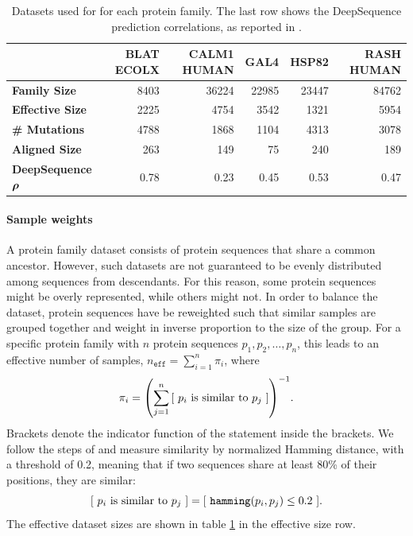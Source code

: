 \begin{table}[ht]
    \centering
    \begin{tabularx}{\textwidth}{lrrrrr}
    \hline
    & \textbf{BLAT ECOLX} & \textbf{CALM1 HUMAN} & \textbf{GAL4} & \textbf{HSP82} & \textbf{RASH HUMAN} \\ \hline
    \textbf{Family Size}              & 8403 & 36224 & 22985 & 23447 & 84762 \\
    \textbf{Effective Size}           & 2225 &  4754 &  3542 &  1321 &  5954 \\
    \textbf{\# Mutations}             & 4788 &  1868 &  1104 &  4313 &  3078 \\
    \textbf{Aligned Size}             &  263 &   149 &    75 &   240 &   189 \\
    \textbf{DeepSequence} $\bm{ \rho }$ & 0.78 &  0.23 &  0.45 &  0.53 &  0.47 \\
    \hline
    \end{tabularx}
    \caption{Datasets used for for each protein family. The last row shows the DeepSequence prediction correlations, as reported in \textcite{riesselman2018deep}.}
    \label{tab:datasets}
\end{table}

\paragraph{Sample weights} A protein family dataset consists of protein sequences that share a common ancestor. However, such datasets are not guaranteed to be evenly distributed among sequences from descendants. For this reason, some protein sequences might be overly represented, while others might not. In order to balance the dataset, protein sequences have be reweighted such that similar samples are grouped together and weight in inverse proportion to the size of the group. For a specific protein family with $n$ protein sequences $p_1, p_2, \ldots, p_n$, this leads to an effective number of samples, $n_{\texttt{eff}} = \sum_{i = 1}^n \pi_i$, where
    \[ \pi_i ={\mathopen{} \left( \sum_{j = 1}^n {\mathopen{} \left[  \text{ $p_i$ is similar to $p_j$ }  \right] \mathclose{}} \right) \mathclose{}}^{-1}. \]
Brackets denote the indicator function of the statement inside the brackets. We follow the steps of \textcite{riesselman2018deep, hopf2017mutation} and measure similarity by normalized Hamming distance, with a threshold of 0.2, meaning that if two sequences share at least 80\% of their positions, they are similar:
  \[ {\mathopen{} \left[  \text{ $p_i$ is similar to $p_j$ }  \right] \mathclose{}} = {\mathopen{} \left[  \ \texttt{hamming}{\mathopen{} \left( p_i, p_j \right) \mathclose{}} \leq 0.2 \  \right] \mathclose{}}.\]
The effective dataset sizes are shown in table \ref{tab:datasets} in the effective size row.
